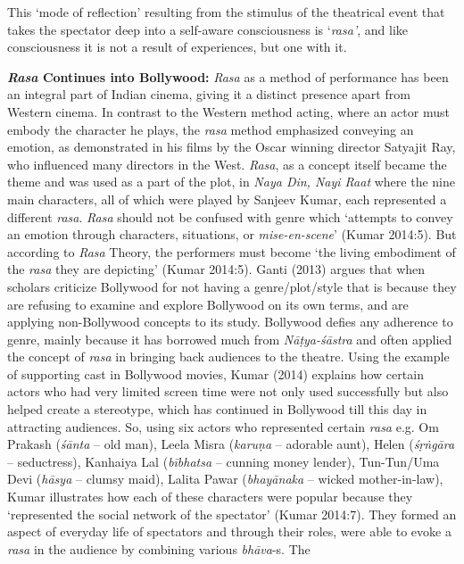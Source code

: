 This ‘mode of reflection’ resulting from the stimulus of the theatrical event that takes the spectator deep into a self-aware consciousness is ‘\textsl{rasa’}, and like consciousness it is not a result of experiences, but one with it.

\textbf{\textsl{Rasa} Continues into Bollywood:} \textsl{Rasa} as a method of performance has been an integral part of Indian cinema, giving it a distinct presence apart from Western cinema. In contrast to the Western method acting, where an actor must embody the character he plays, the \textsl{rasa} method emphasized conveying an emotion, as demonstrated in his films by the Oscar winning director Satyajit Ray, who influenced many directors in the West. \textsl{Rasa}, as a concept itself became the theme and was used as a part of the plot, in \textsl{Naya Din, Nayi Raat} where the nine main characters, all of which were played by Sanjeev Kumar, each represented a different \textsl{rasa}. \textsl{Rasa} should not be confused with genre which ‘attempts to convey an emotion through characters, situations, or \textsl{mise-en-scene}’ (Kumar 2014:5). But according to \textsl{Rasa} Theory, the performers must become ‘the living embodiment of the \textsl{rasa} they are depicting’ (Kumar 2014:5). Ganti (2013) argues that when scholars criticize Bollywood for not having a genre/plot/style that is because they are refusing to examine and explore Bollywood on its own terms, and are applying non-Bollywood concepts to its study. Bollywood defies any adherence to genre, mainly because it has borrowed much from \textsl{Nāṭya-śāstra} and often applied the concept of \textsl{rasa} in bringing back audiences to the theatre. Using the example of supporting cast in Bollywood movies, Kumar (2014) explains how certain actors who had very limited screen time were not only used successfully but also helped create a stereotype, which has continued in Bollywood till this day in attracting audiences. So, using six actors who represented certain \textsl{rasa} e.g. Om Prakash (\textsl{śānta} -- old man), Leela Misra (\textsl{karuṇa} -- adorable aunt), Helen (\textsl{śṛṅgāra} -- seductress), Kanhaiya Lal (\textsl{bībhatsa} -- cunning money lender), Tun-Tun/Uma Devi (\textsl{hāsya} -- clumsy maid), Lalita Pawar (\textsl{bhayānaka} -- wicked mother-in-law), Kumar illustrates how each of these characters were popular because they ‘represented the social network of the spectator’ (Kumar 2014:7). They formed an aspect of everyday life of spectators and through their roles, were able to evoke a \textsl{rasa} in the audience by combining various \textsl{bhāva}-s. The 